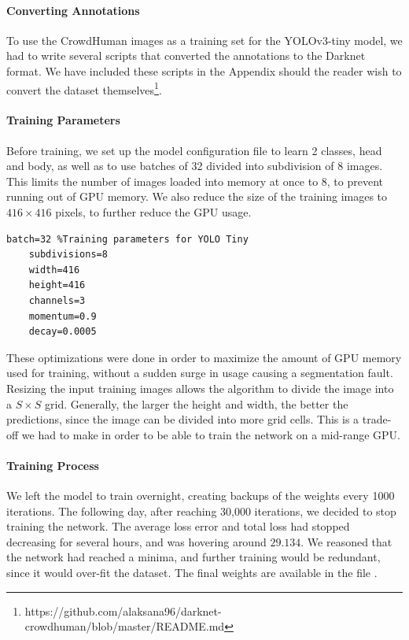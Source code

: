 \paragraph{Converting Annotations} To use the CrowdHuman images as a training set for the YOLOv3-tiny model, we had to write several scripts that converted the annotations to the Darknet format. We have included these scripts in the Appendix should the reader wish to convert the dataset themselves\footnote{https://github.com/alaksana96/darknet-crowdhuman/blob/master/README.md}.

\paragraph{Training Parameters} Before training, we set up the model configuration file to learn 2 classes, head and body, as well as to use batches of 32 divided into subdivision of 8 images. This limits the number of images loaded into memory at once to 8, to prevent running out of GPU memory. We also reduce the size of the training images to $416\times 416$ pixels, to further reduce the GPU usage. \\

\begin{lstlisting}[language=Mymatlab,caption={Training parameters used for YOLOv3 Tiny on the CrowdHuman dataset}]
	batch=32 %Training parameters for YOLO Tiny
	subdivisions=8
	width=416
	height=416
	channels=3
	momentum=0.9
	decay=0.0005
\end{lstlisting}

These optimizations were done in order to maximize the amount of GPU memory used for training, without a sudden surge in usage causing a segmentation fault. Resizing the input training images allows the algorithm to divide the image into a $S\times S$ grid. Generally, the larger the height and width, the better the predictions, since the image can be divided into more grid cells. This is a trade-off we had to make in order to be able to train the network on a mid-range GPU.

\paragraph{Training Process} We left the model to train overnight, creating backups of the weights every 1000 iterations. The following day, after reaching 30,000 iterations, we decided to stop training the network. The average loss error and total loss had stopped decreasing for several hours, and was hovering around $29.134$. We reasoned that the network had reached a minima, and further training would be redundant, since it would over-fit the dataset. The final weights are available in the file  .

